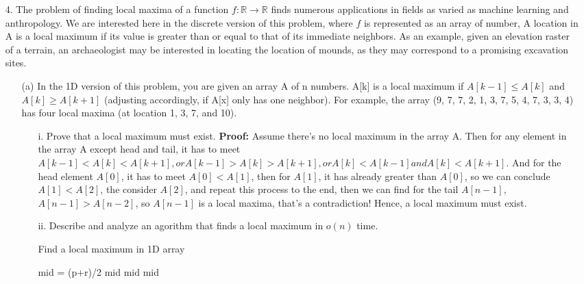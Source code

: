 \documentclass{article}       %
\begin{document}
\begin{enumerate}
	\item[4.] The problem of finding local maxima of a function $f : \mathbb{R} \to \mathbb{R}$ finds numerous applications in fields as varied as machine learning and anthropology. We are interested here in the discrete version of this problem, where $f$ is represented as an array of number, A location in A is a local maximum if its value is greater than or equal to that of its immediate neighbors. As an example, given an elevation raster of a terrain, an archaeologist may be interested in locating the location of mounds, as they may correspond to a promising excavation sites.\newline
	\begin{enumerate}
		\item[(a)] In the 1D version of this problem, you are given an array A of n numbers. A[k] is a local maximum if $A[k-1] \leq A[k]$ and $A[k] \geq A[k+1]$ (adjusting accordingly, if A[x] only has one neighbor). For example, the array (9, 7, 7, 2, 1, 3, 7, 5, 4, 7, 3, 3, 4) has four local maxima (at location 1, 3, 7, and 10).
		\begin{enumerate}
			\item [i.] Prove that a local maximum must exist.\newline
			\textbf{Proof:} Assume there's no local maximum in the array A. Then for any element in the array A except head and tail, it has to meet $A[k-1] < A[k] < A[k+1], or A[k-1] > A[k] > A[k+1], or A[k] < A[k-1] and A[k] < A[k+1]$. And for the head element $A[0]$, it has to meet $A[0] < A[1]$, then for $A[1]$, it has already greater than $A[0]$, so we can conclude $A[1] < A[2]$, the consider $A[2]$, and repeat this process to the end, then we can find for the tail $A[n-1]$, $A[n-1] > A[n-2]$, so $A[n-1]$ is a local maxima, that's a contradiction! Hence, a local maximum must exist.\newline
			\item[ii.] Describe and analyze an agorithm that finds a local maximum in $o(n)$ time.
			\begin{algorithm}[H]
				\caption{Find a local maximum in 1D array}
				\small
				\begin{algorithmic}[1]
					\State mid = (p+r)/2
					\State \Return mid
					\Else {}
					\State \Return mid
					\EndIf
					\State \Return mid
					\EndIf

\end{algorithmic}
\end{algorithm}
\end{enumerate}
\end{enumerate}
\end{enumerate}
\end{document}
